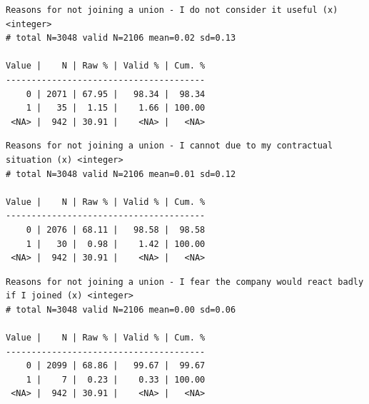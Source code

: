 \documentclass[
  letterpaper,
  DIV=11,
  numbers=noendperiod]{scrreprt}
\newenvironment{Shaded}{\begin{snugshade}}{\end{snugshade}}
\newcommand{\FunctionTok}[1]{\textcolor[rgb]{0.28,0.35,0.67}{#1}}
\newcommand{\NormalTok}[1]{\textcolor[rgb]{0.00,0.23,0.31}{#1}}
\newcommand{\SpecialCharTok}[1]{\textcolor[rgb]{0.37,0.37,0.37}{#1}}
\begin{document}
\begin{Shaded}
\end{Shaded}

\begin{verbatim}
Reasons for not joining a union - I do not consider it useful (x) <integer> 
# total N=3048 valid N=2106 mean=0.02 sd=0.13

Value |    N | Raw % | Valid % | Cum. %
---------------------------------------
    0 | 2071 | 67.95 |   98.34 |  98.34
    1 |   35 |  1.15 |    1.66 | 100.00
 <NA> |  942 | 30.91 |    <NA> |   <NA>
\end{verbatim}

\begin{Shaded}
\end{Shaded}

\begin{verbatim}
Reasons for not joining a union - I cannot due to my contractual situation (x) <integer> 
# total N=3048 valid N=2106 mean=0.01 sd=0.12

Value |    N | Raw % | Valid % | Cum. %
---------------------------------------
    0 | 2076 | 68.11 |   98.58 |  98.58
    1 |   30 |  0.98 |    1.42 | 100.00
 <NA> |  942 | 30.91 |    <NA> |   <NA>
\end{verbatim}

\begin{Shaded}
\end{Shaded}

\begin{verbatim}
Reasons for not joining a union - I fear the company would react badly if I joined (x) <integer> 
# total N=3048 valid N=2106 mean=0.00 sd=0.06

Value |    N | Raw % | Valid % | Cum. %
---------------------------------------
    0 | 2099 | 68.86 |   99.67 |  99.67
    1 |    7 |  0.23 |    0.33 | 100.00
 <NA> |  942 | 30.91 |    <NA> |   <NA>
\end{verbatim}
\end{document}
